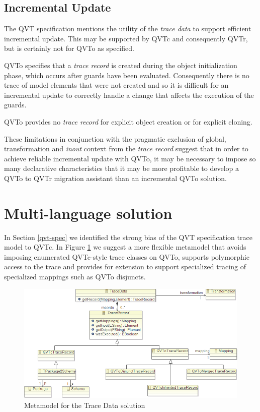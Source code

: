 \documentclass[runningheads,a4paper]{llncs}
\begin{document}
\subsection{Incremental Update}

The QVT specification mentions the utility of the \emph{trace data} to support efficient incremental update. This may be supported by QVTc and consequently QVTr, but is certainly not for QVTo as specified.

QVTo specifies that a \emph{trace record} is created during the object initialization phase, which occurs after guards have been evaluated. Consequently there is no trace of model elements that were not created and so it is difficult for an incremental update to correctly handle a change that affects the execution of the guards.

QVTo provides no \emph{trace record} for explicit object creation or for explicit cloning.

These limitations in conjunction with the pragmatic exclusion of global, transformation and \emph{inout} context from the \emph{trace record} suggest that in order to achieve reliable incremental update with QVTo, it may be necessary to impose so many declarative characteristics that it may be more profitable to develop a QVTo to QVTr migration assistant than an incremental QVTo solution. 

\section{Multi-language solution}\label{solution}

In Section \ref{qvt-spec} we identified the strong bias of the QVT specification trace model to QVTc. In Figure \ref{fig:TraceDataMM} we suggest a more flexible metamodel that avoids imposing enumerated QVTc-style trace classes on QVTo, supports polymorphic access to the trace and provides for extension to support specialized tracing of specialized mappings such as QVTo disjuncts. 
\begin{figure}
  \begin{center}
    \includegraphics[width=4.5in]{TraceData.png}
  \end{center}
  \caption{Metamodel for the Trace Data solution}
  \label{fig:TraceDataMM}
\end{figure}
\end{document}
